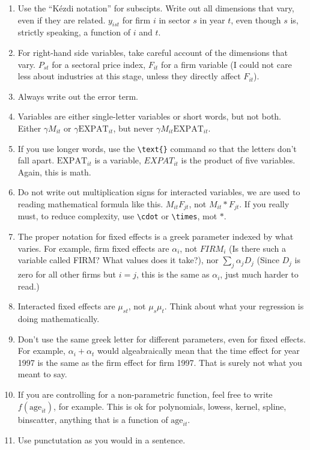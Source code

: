 \documentclass[12pt,a4paper]{article}
\begin{document}
\begin{enumerate}
	\item Use the ``Kézdi notation'' for subscipts. Write out all dimensions that vary, even if they are related. $y_{ist}$ for firm $i$ in sector $s$ in year $t$, even though $s$ is, strictly speaking, a function of $i$ and $t$.
	\item For right-hand side variables, take careful account of the dimensions that vary. $P_{st}$ for a sectoral price index, $F_{it}$ for a firm variable (I could not care less about industries at this stage, unless they directly affect $F_{it}$).
	\item Always write out the error term. 
	\item Variables are either single-letter variables or short words, but not both. Either $\gamma M_{it}$ or $\gamma \text{EXPAT}_{it}$, but never $\gamma M_{it}\text{EXPAT}_{it}$. 
	\item If you use longer words, use the \texttt{\textbackslash text\{\}} command so that the letters don't fall apart. $\text{EXPAT}_{it}$ is a variable, $EXPAT_{it}$ is the product of five variables. Again, this is math.
	\item Do not write out multiplication signs for interacted variables, we are used to reading mathematical formula like this. $M_{it}F_{jt}$, not $M_{it}*F_{jt}$. If you really must, to reduce complexity, use \texttt{\textbackslash cdot} or \texttt{\textbackslash times}, mot $*$.
	\item The proper notation for fixed effects is a greek parameter indexed by what varies. For example, firm fixed effects are $\alpha_i$, not $FIRM_i$ (Is there such a variable called FIRM? What values does it take?), nor $\sum_j \alpha_j D_j$ (Since $D_j$ is zero for all other firms but $i=j$, this is the same as $\alpha_i$, just much harder to read.)

	\item Interacted fixed effects are $\mu_{st}$, not $\mu_s\mu_t$. Think about what your regression is doing mathematically.

	\item Don't use the same greek letter for different parameters, even for fixed effects. For example, $\alpha_i + \alpha_t$ would algeabraically mean that the time effect for year 1997 is the same as the firm effect for firm 1997. That is surely not what you meant to say.

	\item If you are controlling for a non-parametric function, feel free to write $f(\text{age}_{it})$, for example. This is ok for polynomials, lowess, kernel, spline, binscatter, anything that is a function of $\text{age}_{it}$.

	\item Use punctutation as you would in a sentence.
\end{enumerate}
\end{document}
